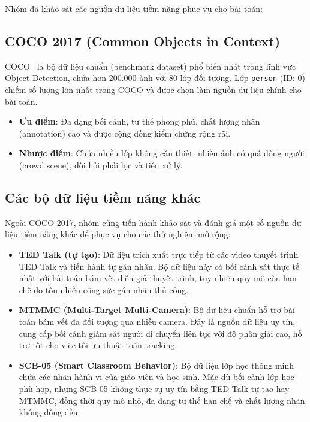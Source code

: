 Nhóm đã khảo sát các nguồn dữ liệu tiềm năng phục vụ cho bài toán:

\subsection{COCO 2017 (Common Objects in Context)}

COCO~\cite{coco} là bộ dữ liệu chuẩn (benchmark dataset) phổ biến nhất trong lĩnh vực Object Detection, chứa hơn 200.000 ảnh với 80 lớp đối tượng. Lớp \texttt{person} (ID: 0) chiếm số lượng lớn nhất trong COCO và được chọn làm nguồn dữ liệu chính cho bài toán.

\begin{itemize}
    \item \textbf{Ưu điểm}: Đa dạng bối cảnh, tư thế phong phú, chất lượng nhãn (annotation) cao và được cộng đồng kiểm chứng rộng rãi.
    \item \textbf{Nhược điểm}: Chứa nhiều lớp không cần thiết, nhiều ảnh có quá đông người (crowd scene), đòi hỏi phải lọc và tiền xử lý.
\end{itemize}

\subsection{Các bộ dữ liệu tiềm năng khác}

Ngoài COCO 2017, nhóm cũng tiến hành khảo sát và đánh giá một số nguồn dữ liệu tiềm năng khác để phục vụ cho các thử nghiệm mở rộng:

\begin{itemize}
    \item \textbf{TED Talk (tự tạo)}: Dữ liệu trích xuất trực tiếp từ các video thuyết trình TED Talk và tiến hành tự gán nhãn. Bộ dữ liệu này có bối cảnh sát thực tế nhất với bài toán bám vết diễn giả thuyết trình, tuy nhiên quy mô còn hạn chế do tốn nhiều công sức gán nhãn thủ công.
    \item \textbf{MTMMC (Multi-Target Multi-Camera)}: Bộ dữ liệu chuẩn hỗ trợ bài toán bám vết đa đối tượng qua nhiều camera. Đây là nguồn dữ liệu uy tín, cung cấp bối cảnh giám sát người di chuyển liên tục với độ phân giải cao, hỗ trợ tốt cho việc tối ưu thuật toán tracking.
    \item \textbf{SCB-05 (Smart Classroom Behavior)}: Bộ dữ liệu lớp học thông minh chứa các nhãn hành vi của giáo viên và học sinh. Mặc dù bối cảnh lớp học phù hợp, nhưng SCB-05 không thực sự uy tín bằng TED Talk tự tạo hay MTMMC, đồng thời quy mô nhỏ, đa dạng tư thế hạn chế và chất lượng nhãn không đồng đều.
\end{itemize}

